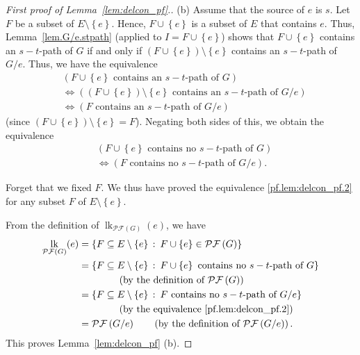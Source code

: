 \documentclass[12pt]{amsart}
\theoremstyle{definition}
\newcommand{\with}{\,\colon\,}
\DeclareMathOperator{\lk}{lk}
\newcommand{\set}[1]{\left\{ #1 \right\}}
\newcommand{\tup}[1]{\left( #1 \right)}
\newcommand{\Pf}[1]{\mathcal{PF}\left(#1\right)}
\begin{document}
\begin{proof}[First proof of Lemma~\ref{lem:delcon_pf}.]
    (b) Assume that the source of $e$ is $s$.
    Let $F$ be a subset of $E \setminus \set{e}$. Hence,
    $F \cup \set{e}$ is a subset of $E$ that contains $e$.
    Thus, Lemma~\ref{lem.G/e.stpath} (applied to $I = F \cup \set{e}$)
    shows that $F \cup \set{e}$ contains an $s-t$-path of $G$ if and
    only if $\tup{F \cup \set{e}} \setminus \set{e}$ contains an $s-t$-path of $G / e$.
    Thus, we have the equivalence
    \begin{align*}
    & \tup{F \cup \set{e} \text{ contains an $s-t$-path of $G$}} 
    \\
    &\Longleftrightarrow  \tup{\tup{F \cup \set{e}} \setminus \set{e} \text{ contains an $s-t$-path of $G / e$}} \\
    &\Longleftrightarrow  \tup{F \text{ contains an $s-t$-path of $G / e$}}
    \end{align*}
    (since $\tup{F \cup \set{e}} \setminus \set{e} = F$).
    Negating both sides of this, we obtain the equivalence
    \begin{align}
    &                   \tup{F \cup \set{e} \text{ contains no $s-t$-path of $G$}} \nonumber\\
    &    \Longleftrightarrow  \tup{F \text{ contains no $s-t$-path of $G / e$}} .
    \label{pf.lem:delcon_pf.2}
    \end{align}

    Forget that we fixed $F$.
    We thus have proved the equivalence \eqref{pf.lem:delcon_pf.2}
    for any subset $F$ of $E \setminus \set{e}$.

    From the definition of $\lk_{\Pf{G}}(e)$, we have
    \begin{align*}
    \lk_{\Pf{G}}(e)
    &= \set{F \subseteq E \setminus \set{e} \with F \cup \set{e} \in \Pf{G}} \\
    &= \set{F \subseteq E \setminus \set{e} \with F \cup \set{e} \text{ contains no $s-t$-path of $G$}} \\
    & \qquad\qquad \tup{\text{by the definition of $\Pf{G}$}} \\
    &= \set{F \subseteq E \setminus \set{e} \with F \text{ contains no $s-t$-path of $G / e$}} \\
    & \qquad\qquad \tup{\text{by the equivalence \eqref{pf.lem:delcon_pf.2}}} \\
    &= \Pf{G / e}
     \qquad \tup{\text{by the definition of $\Pf{G / e}$}} .
    \end{align*}
    This proves Lemma~\ref{lem:delcon_pf} (b).
\end{proof}
\end{document}
